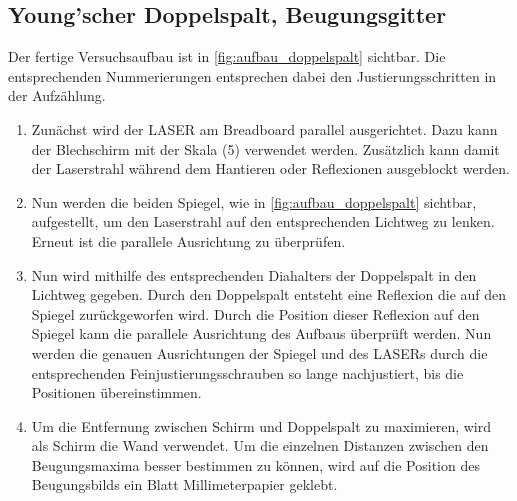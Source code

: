 \documentclass[12pt,english,ngerman]{scrartcl}
\begin{document}
\subsection{Young'scher Doppelspalt, Beugungsgitter}

Der fertige Versuchsaufbau ist in \autoref{fig:aufbau_doppelspalt} sichtbar.
Die entsprechenden Nummerierungen entsprechen dabei den Justierungsschritten in
der Aufzählung.

\begin{enumerate}
	\item Zunächst wird der LASER am Breadboard parallel ausgerichtet. Dazu kann der
	      Blechschirm mit der Skala (5) verwendet werden. Zusätzlich kann damit der
	      Laserstrahl während dem Hantieren oder Reflexionen ausgeblockt werden.
	\item Nun werden die beiden Spiegel, wie in \autoref{fig:aufbau_doppelspalt}
	      sichtbar, aufgestellt, um den Laserstrahl auf den entsprechenden Lichtweg zu
	      lenken. Erneut ist die parallele Ausrichtung zu überprüfen.
	\item Nun wird mithilfe des entsprechenden Diahalters der Doppelspalt in den Lichtweg
	      gegeben. Durch den Doppelspalt entsteht eine Reflexion die auf den Spiegel
	      zurückgeworfen wird. Durch die Position dieser Reflexion auf den Spiegel kann
	      die parallele Ausrichtung des Aufbaus überprüft werden. Nun werden die genauen
	      Ausrichtungen der Spiegel und des LASERs durch die entsprechenden
	      Feinjustierungsschrauben so lange nachjustiert, bis die Positionen
	      übereinstimmen.
	\item Um die Entfernung zwischen Schirm und Doppelspalt zu maximieren, wird als
	      Schirm die Wand verwendet. Um die einzelnen Distanzen zwischen den
	      Beugungsmaxima besser bestimmen zu können, wird auf die Position des
	      Beugungsbilds ein Blatt Millimeterpapier geklebt.
\end{enumerate}
\end{document}
